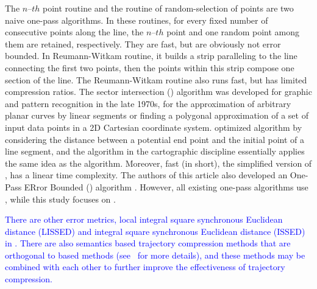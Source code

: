 The $n$--${th}$ point routine and the routine of random-selection of points \cite{Shi:Survey} are two naive one-pass algorithms.
In these routines, for every fixed number of consecutive points along the line, the $n$--${th}$  point and one random point among them are retained, respectively.
They are fast, but are obviously not error bounded.
%
In Reumann-Witkam routine\cite{Reumann:Strip}, it builds a strip paralleling to the line connecting the first two points, then the points within this strip compose one section of the line.
The Reumann-Witkam routine also runs fast, but has limited compression ratios.
%
The sector intersection (\cia) algorithm \cite{Williams:Longest, Sklansky:Cone} was developed for graphic and pattern recognition in the late 1970s, for the approximation of arbitrary planar curves by linear segments or finding a polygonal approximation of a set of input data points in a 2D Cartesian coordinate system. \cite{Dunham:Cone} optimized algorithm \cia by considering the distance between a potential end point and the initial point of a line segment, and the \sleeve algorithm \cite{Zhao:Sleeve} in the cartographic discipline essentially applies the same idea as the \cia algorithm.
%
Moreover, {fast \bqsa \cite{Liu:BQS} (\fbqsa in short), the simplified version of \bqsa, has a linear time complexity.}
%
The authors of this article also developed an One-Pass ERror Bounded (\operb) algorithm \cite{Lin:Operb}.
%
However, all existing one-pass algorithms  use \ped \cite{Williams:Longest, Sklansky:Cone, Dunham:Cone, Zhao:Sleeve,Liu:BQS,Lin:Operb}, while this study focuses on \sed.


\textcolor{blue}{There are other error metrics, \eg local integral square synchronous Euclidean distance (LISSED) and integral square synchronous Euclidean distance (ISSED) in \cite{Chen:Fast}.
There are also semantics based trajectory compression methods that are orthogonal to \lsa based methods (see~\cite{Lin:Operb, Han:Compress} for more details), and these methods may be combined with each other to further improve the effectiveness of trajectory compression.}

